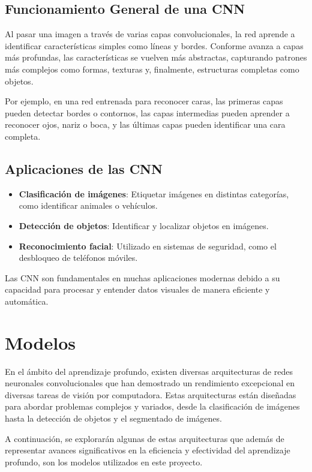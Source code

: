 \subsection{Funcionamiento General de una CNN}\label{subsec:funcionamiento-general-de-una-cnn}
Al pasar una imagen a través de varias capas convolucionales, la red aprende a identificar características simples como
líneas y bordes.
Conforme avanza a capas más profundas, las características se vuelven más abstractas, capturando patrones más complejos
como formas, texturas y, finalmente, estructuras completas como objetos.


Por ejemplo, en una red entrenada para reconocer caras, las primeras capas pueden detectar bordes o contornos, las
capas intermedias pueden aprender a reconocer ojos, nariz o boca, y las últimas capas pueden identificar una cara
completa.

\subsection{Aplicaciones de las CNN}\label{subsec:aplicaciones-de-las-cnn}
\begin{itemize}
    \item \textbf{Clasificación de imágenes}: Etiquetar imágenes en distintas categorías, como identificar animales o
          vehículos.
    \item \textbf{Detección de objetos}: Identificar y localizar objetos en imágenes.
    \item \textbf{Reconocimiento facial}: Utilizado en sistemas de seguridad, como el desbloqueo de teléfonos móviles.
\end{itemize}

Las CNN son fundamentales en muchas aplicaciones modernas debido a su capacidad para procesar y entender datos visuales
de manera eficiente y automática.

\section{Modelos}\label{sec:modelos}
En el ámbito del aprendizaje profundo, existen diversas arquitecturas de redes neuronales convolucionales que han
demostrado un rendimiento excepcional en diversas tareas de visión por computadora.
Estas arquitecturas están diseñadas para abordar problemas complejos y variados, desde la clasificación de imágenes
hasta la detección de objetos y el segmentado de imágenes.


A continuación, se explorarán algunas de estas arquitecturas que además de representar avances significativos en la eficiencia y
efectividad del aprendizaje profundo, son los modelos utilizados en este proyecto.


